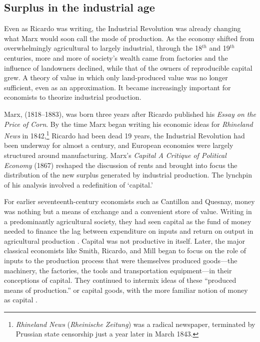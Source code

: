 \subsection{Surplus in the industrial age}

Even as Ricardo was writing, the Industrial Revolution was already changing what Marx would soon call the mode of production.  As the economy shifted  from overwhelmingly agricultural to largely industrial,  through %
the 18$^{th}$  and 19$^{th}$ centuries, more and more of society's wealth came from %
factories %
and the influence of landowners declined, while that of the owners of \gls{reproducible capital} grew. A theory of value in which only land-produced value was no longer sufficient, even as an approximation.  It became increasingly important for economists to theorize industrial production.

Marx, (1818--1883), was born three years after Ricardo published his \textit{Essay on the Price of Corn}. 
By the time Marx began writing his economic ideas for \textit{Rhineland News} in 1842,\footnote{\textit{Rhineland News} (\textit{Rheinische Zeitung}) was a radical newspaper, terminated by Prussian state censorship just a year later in March 1843.} Ricardo had been dead 19 years, the Industrial Revolution had been underway for almost a century, and European economies were largely structured around manufacturing. Marx's \emph{Capital A Critique of Political Economy} (1867) \cite{marxKapitalCritiquePolitical1959} reshaped the discussion of rents  and brought into focus the distribution of the new surplus generated by industrial production. The lynchpin of his analysis involved a redefinition of `capital.' 

For earlier seventeenth-century economists such as Cantillon and Quesnay, money was nothing but a means of exchange and a convenient store of value.  Writing in a predominantly agricultural society, they had seen capital as the fund of money needed to finance the lag between expenditure on inputs and return on output in agricultural production \cite{cannanEarlyHistoryTerm1921, royEvolutionConceptCapital2009}. Capital was not productive in itself. 
Later, the major classical economists like Smith, Ricardo, and Mill %
began to focus on the role of inputs to the production process that were themselves produced goods---the machinery, the factories, the tools and transportation equipment---in their conceptions of capital. They continued to intermix ideas of these ``produced means of production.'' or capital goods, with the more familiar notion of 
money as capital \cite{royEvolutionConceptCapital2009}. %

